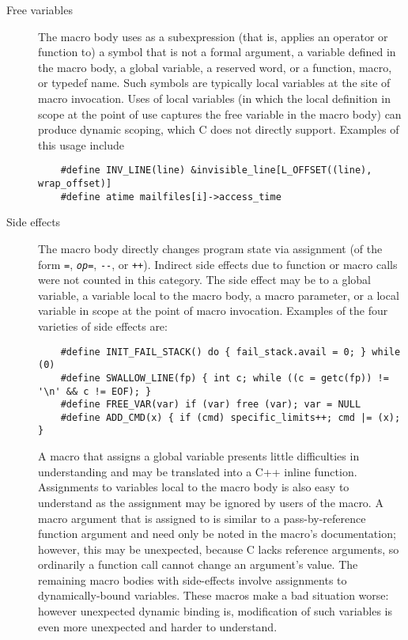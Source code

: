 \documentclass[10pt]{article}
\begin{document}
\label{desc:properties}

\begin{description}
\item[Free variables]\label{page:freevar}
  The macro body uses as a subexpression (that is, applies an operator or
  function to) a symbol that is not a formal argument, a variable defined
  in the macro body, a global variable, a reserved word, or a function, macro, or typedef
  name.  Such symbols are typically local variables at the site of
  macro invocation.  Uses of local variables (in which the local definition
  in scope at the point of use captures the free variable in the macro
  body) can produce dynamic scoping, which C does not directly support.
  Examples of this usage include
\begin{verbatim}
    #define INV_LINE(line) &invisible_line[L_OFFSET((line), wrap_offset)]
    #define atime mailfiles[i]->access_time
\end{verbatim}

\item[Side effects]
  The macro body directly changes program state via assignment (of the form
  {\tt =}, {\tt {\em op}=}, {\tt -{}-}, or {\tt ++}).  
  Indirect side
  effects due to function or macro calls were not counted in this category.
  The side effect may be to a
  global variable, a variable local to the macro body, a macro parameter,
  or a local variable in scope at the point of macro invocation.
  Examples of the four varieties of side effects are:
\begin{verbatim}
    #define INIT_FAIL_STACK() do { fail_stack.avail = 0; } while (0)
    #define SWALLOW_LINE(fp) { int c; while ((c = getc(fp)) != '\n' && c != EOF); }
    #define FREE_VAR(var) if (var) free (var); var = NULL
    #define ADD_CMD(x) { if (cmd) specific_limits++; cmd |= (x); }
\end{verbatim}

  A macro that assigns a global variable presents little difficulties in
  understanding and may be translated into a C++ inline function.
  Assignments to variables local to the macro body is also easy to understand
  as the assignment may be ignored by users
  of the macro.  A macro argument that is assigned to is similar to a
  pass-by-reference function argument and need only be noted in the macro's
  documentation; however, this may be unexpected, because C lacks reference
  arguments, so ordinarily a function call cannot change an argument's
  value.  The remaining macro bodies with side-effects involve assignments
  to dynamically-bound variables.  These macros make a bad situation worse: however
  unexpected dynamic binding is, modification of such variables is even
  more unexpected and harder to understand.
  


\end{description}
\end{document}
